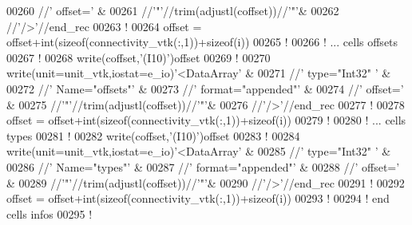 \begin{DoxyCode}
00260                                 //\textcolor{stringliteral}{' offset='}                      &
00261                                 //\textcolor{stringliteral}{'"'}//trim(adjustl(coffset))//\textcolor{stringliteral}{'"'}&
00262                                 //\textcolor{stringliteral}{'/>'}//end\_rec
00263 \textcolor{comment}{!}
00264 offset = offset+int(sizeof(connectivity\_vtk(:,1))+sizeof(i))
00265 \textcolor{comment}{!}
00266 \textcolor{comment}{! ... cells offsets}
00267 \textcolor{comment}{!}
00268 \textcolor{keyword}{write}(coffset,\textcolor{stringliteral}{'(I10)'})offset
00269 \textcolor{comment}{!}
00270 \textcolor{keyword}{write}(unit=unit\_vtk,iostat=e\_io)\textcolor{stringliteral}{'<DataArray'}                      &
00271                                 //\textcolor{stringliteral}{' type="Int32" '}                &
00272                                 //\textcolor{stringliteral}{' Name="offsets"'}               &
00273                                 //\textcolor{stringliteral}{' format="appended"'}            &
00274                                 //\textcolor{stringliteral}{' offset='}                      &
00275                                 //\textcolor{stringliteral}{'"'}//trim(adjustl(coffset))//\textcolor{stringliteral}{'"'}&
00276                                 //\textcolor{stringliteral}{'/>'}//end\_rec
00277 \textcolor{comment}{!}
00278 offset = offset+int(sizeof(connectivity\_vtk(:,1))+sizeof(i))
00279 \textcolor{comment}{!}
00280 \textcolor{comment}{! ... cells types}
00281 \textcolor{comment}{!}
00282 \textcolor{keyword}{write}(coffset,\textcolor{stringliteral}{'(I10)'})offset
00283 \textcolor{comment}{!}
00284 \textcolor{keyword}{write}(unit=unit\_vtk,iostat=e\_io)\textcolor{stringliteral}{'<DataArray'}                      &
00285                                 //\textcolor{stringliteral}{' type="Int32" '}                &
00286                                 //\textcolor{stringliteral}{' Name="types"'}                 &
00287                                 //\textcolor{stringliteral}{' format="appended"'}            &
00288                                 //\textcolor{stringliteral}{' offset='}                      &
00289                                 //\textcolor{stringliteral}{'"'}//trim(adjustl(coffset))//\textcolor{stringliteral}{'"'}&
00290                                 //\textcolor{stringliteral}{'/>'}//end\_rec
00291 \textcolor{comment}{!}
00292 offset = offset+int(sizeof(connectivity\_vtk(:,1))+sizeof(i))
00293 \textcolor{comment}{!}
00294 \textcolor{comment}{! end cells infos}
00295 \textcolor{comment}{!}

\end{DoxyCode}
